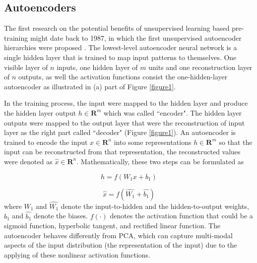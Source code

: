 \documentclass{bmcart}
\begin{document}
\subsection*{Autoencoders}
The first research on the potential benefits of unsupervised learning based pre-training might date back to 1987, in which the first unsupervised autoencoder hierarchies were proposed \cite{ballard1987modular}. The lowest-level autoencoder neural network is a single hidden layer that is trained to map input patterns to themselves. One visible layer of $n$ inputs, one hidden layer of $m$ units and one reconstruction layer of $n$ outputs, as well the activation functions consist the one-hidden-layer autoencoder as illustrated in (a) part of Figure \ref{figure1}.


In the training process, the input were mapped to the hidden layer and produce the hidden layer output $h\in{\mathbf{R}^m}$ which was called ``encoder". The hidden layer outputs were mapped to the output layer that were the reconstruction of input layer as the right part called ``decoder" (Figure \ref{figure1}). An autoencoder is trained to encode the input $x\in{\mathbf{R}^n}$ into some representations $h\in{\mathbf{R}^m}$ so that the input can be reconstructed from that representation\cite{bengio2009}, the reconstructed values were denoted as $\hat{x}\in{\mathbf{R}^n}$. Mathematically, these two steps can be formulated as



\begin{equation}
h = f(W_{1}x+b_{1})
\end{equation}

\begin{equation}
\hat{x}= f(\hat{W_{1}} + \hat{b_{1}})
\end{equation}
where $W_1$ and $\hat{W_1}$ denote the input-to-hidden and the hidden-to-output weights, $b_1$ and $\hat{b_1}$ denote the biases. $f(\cdot)$ denotes the activation function that could be a sigmoid function, hyperbolic tangent, and rectified linear function. The autoencoder behaves differently from PCA, which can capture multi-modal aspects of the input distribution (the representation of the input) \cite{jap} due to the applying of these nonlinear activation functions.
\end{document}
